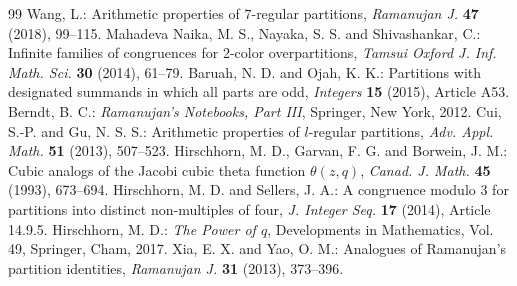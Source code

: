 \documentclass[10pt,a4paper]{amsart}
\numberwithin{equation}{section}
\begin{document}
\begin{thebibliography}{99}
 Wang, L.: Arithmetic properties of $7$-regular partitions, {\em Ramanujan J.} \textbf{47} (2018), 99--115.
 Mahadeva Naika, M. S., Nayaka, S. S. and Shivashankar, C.: Infinite families of congruences for $2$-color overpartitions, {\em Tamsui Oxford J. Inf. Math. Sci.} \textbf{30} (2014), 61--79.
 Baruah, N. D. and Ojah, K. K.: Partitions with designated summands in which all parts are odd, {\em Integers} \textbf{15} (2015), Article A53.
 Berndt, B. C.: {\em Ramanujan's Notebooks, Part III}, Springer, New York, 2012.
 Cui, S.-P. and Gu, N. S. S.: Arithmetic properties of $l$-regular partitions, {\em Adv. Appl. Math.} \textbf{51} (2013), 507--523.
 Hirschhorn, M. D., Garvan, F. G. and Borwein, J. M.: Cubic analogs of the Jacobi cubic theta function $\theta(z,q)$, {\em Canad. J. Math.} \textbf{45} (1993), 673--694.
 Hirschhorn, M. D. and Sellers, J. A.: A congruence modulo $3$ for partitions into distinct non-multiples of four, {\em J. Integer Seq.} \textbf{17} (2014), Article 14.9.5.
 Hirschhorn, M. D.: {\em The Power of $q$}, Developments in Mathematics, Vol. 49, Springer, Cham, 2017.
 Xia, E. X. and Yao, O. M.: Analogues of Ramanujan's partition identities, {\em Ramanujan J.} \textbf{31} (2013), 373--396.
\end{thebibliography}
\end{document}
